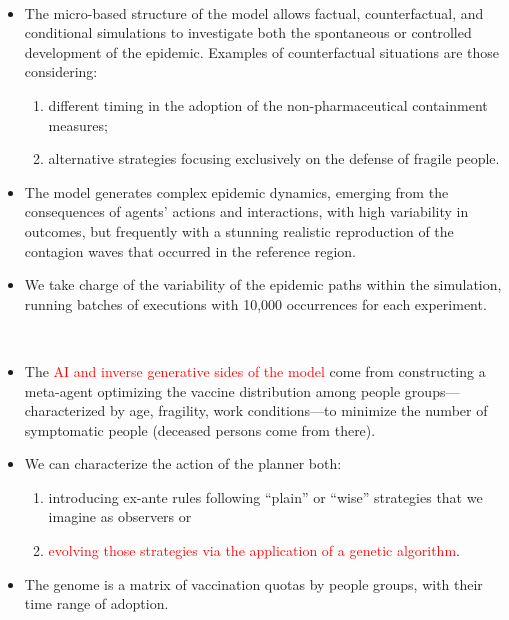 \documentclass[9pt]{beamer}
\begin{document}
\begin{frame}{~}

\begin{itemize}
\item
The micro-based structure of the model allows factual, counterfactual, and conditional simulations to investigate both the spontaneous or controlled development of the epidemic. Examples of counterfactual situations are those considering:

\begin{enumerate}[i]
\item different timing in the adoption of the non-pharmaceutical containment measures;
\item  alternative strategies focusing exclusively on the defense of fragile people.
\end{enumerate}

\item
The model generates complex epidemic dynamics, emerging from the consequences of agents' actions and interactions, with high variability in outcomes, but frequently with a stunning realistic reproduction of the  contagion waves that occurred in the reference region. 

\item
We take charge of the variability of the epidemic paths within the simulation, running batches of executions with 10,000 occurrences for each experiment.

\end{itemize}
\end{frame}

\begin{frame}{~}

\begin{itemize}

\item The \textcolor{red}{AI and inverse generative sides of the model} come from constructing a meta-agent optimizing the vaccine distribution among people groups---characterized by age, fragility, work conditions---to minimize the number of symptomatic people (deceased persons come from there).

\item We can characterize the action of the planner both:
\begin{enumerate}[i]
\item introducing ex-ante rules following ``plain'' or ``wise'' strategies that we imagine as observers or
\item \textcolor{red}{evolving those strategies via the application of a genetic algorithm}. 
\end{enumerate}

\item The genome is a matrix of vaccination quotas by people groups, with their time range of adoption. 

\end{itemize}


\end{frame}
\end{document}
